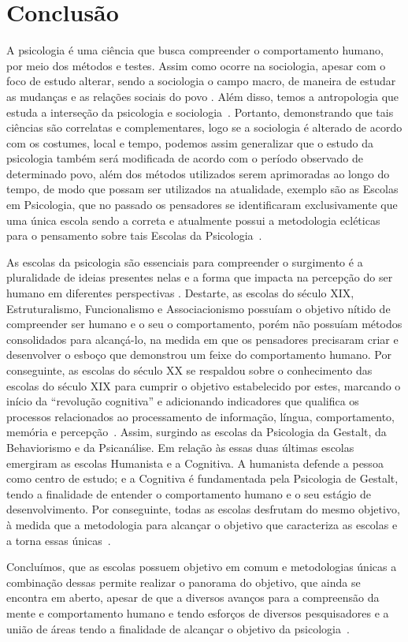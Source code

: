 \section{Conclusão}\label{conclusao}

A psicologia é uma ciência que busca compreender o comportamento humano, por meio dos métodos e testes.
Assim como ocorre na sociologia, apesar com o foco de estudo alterar, sendo a sociologia o campo macro, de maneira de estudar as mudanças e as relações sociais do povo \cite{quintaneiro2003toque}.
Além disso, temos a antropologia que estuda a interseção da psicologia e sociologia~\cite{castro2016antropologia}.
Portanto, demonstrando que tais ciências são correlatas e complementares, logo se a sociologia é alterado de acordo com os costumes, local e tempo, podemos assim generalizar que o estudo da psicologia também será modificada de acordo com o período observado de determinado povo, além dos métodos utilizados serem aprimoradas ao longo do tempo, de modo que possam ser utilizados na atualidade, exemplo são as Escolas em Psicologia, que no passado os pensadores se identificaram exclusivamente que uma única escola sendo a correta e atualmente possui a metodologia ecléticas para o pensamento sobre tais Escolas da Psicologia~\cite{spink2011psicologia_social}.

As escolas da psicologia são essenciais para compreender o surgimento é a pluralidade de ideias presentes nelas e a forma que impacta na percepção do ser humano em diferentes perspectivas \cite{freitas2008historia}.
Destarte, as escolas do século XIX, Estruturalismo, Funcionalismo e Associacionismo possuíam o objetivo nítido de compreender ser humano e o seu o comportamento, porém não possuíam métodos consolidados para alcançá-lo, na medida em que os pensadores precisaram criar e desenvolver o esboço  que demonstrou um feixe do comportamento humano.
Por conseguinte, as escolas do século XX se respaldou sobre o conhecimento das escolas do século XIX para cumprir o objetivo estabelecido por estes, marcando o início da ``revolução cognitiva'' e adicionando indicadores que qualifica os processos relacionados ao processamento de informação, língua, comportamento, memória e percepção~\cite{eysenck2017psi_cognitiva}.
Assim, surgindo as escolas da Psicologia da Gestalt, da Behaviorismo e da Psicanálise.
Em relação às essas duas últimas escolas emergiram as escolas Humanista e a Cognitiva.
A humanista defende a pessoa como centro de estudo; e a Cognitiva é fundamentada pela Psicologia de Gestalt, tendo a finalidade de entender o comportamento humano e o seu estágio de desenvolvimento.
Por conseguinte, todas as escolas desfrutam do mesmo objetivo, à medida que a metodologia para alcançar o objetivo que caracteriza as escolas e a torna essas únicas~\cite{bock1999psicologias,sternberg2000psicologia}.     

Concluímos, que as escolas possuem objetivo em comum e metodologias únicas a combinação dessas permite realizar o panorama do objetivo, que ainda se encontra em aberto, apesar de que a diversos avanços para a compreensão da mente e comportamento humano e tendo esforços de diversos pesquisadores e a união de áreas tendo a finalidade de alcançar o objetivo da psicologia~\cite{sternberg2000psicologia,eysenck2017psi_cognitiva}.
